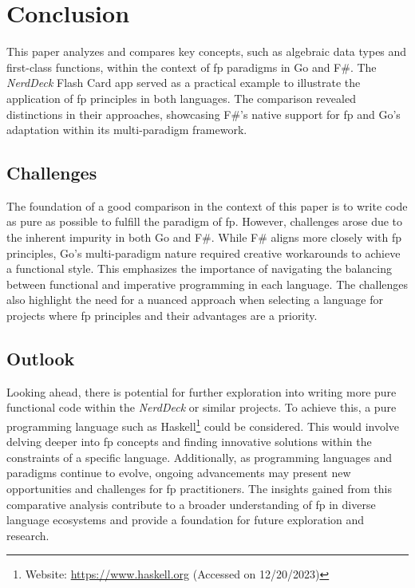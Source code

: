 \chapter{Conclusion}\label{chap:conclusion}
This paper analyzes and compares key concepts, such as algebraic data types and first-class functions, within the context of \ac{fp} paradigms in Go and F\#. The \textit{NerdDeck} Flash Card \ac{app} served as a practical example to illustrate the application of \ac{fp} principles in both languages. The comparison revealed distinctions in their approaches, showcasing F\#'s native support for \ac{fp} and Go's adaptation within its multi-paradigm framework.
    \section{Challenges}\label{sec:challenges}
    The foundation of a good comparison in the context of this paper is to write code as pure as possible to fulfill the paradigm of \ac{fp}. However, challenges arose due to the inherent impurity in both Go and F\#. While F\# aligns more closely with \ac{fp} principles, Go's multi-paradigm nature required creative workarounds to achieve a functional style. This emphasizes the importance of navigating the balancing between functional and imperative programming in each language. The challenges also highlight the need for a nuanced approach when selecting a language for projects where \ac{fp} principles and their advantages are a priority.        

    \section{Outlook}\label{sec:outlook}
    Looking ahead, there is potential for further exploration into writing more pure functional code within the \textit{NerdDeck} or similar projects. To achieve this, a pure programming language such as Haskell\footnote{Website: \url{https://www.haskell.org} (Accessed on 12/20/2023)} could be considered. This would involve delving deeper into \ac{fp} concepts and finding innovative solutions within the constraints of a specific language. Additionally, as programming languages and paradigms continue to evolve, ongoing advancements may present new opportunities and challenges for \ac{fp} practitioners. The insights gained from this comparative analysis contribute to a broader understanding of \ac{fp} in diverse language ecosystems and provide a foundation for future exploration and research.

